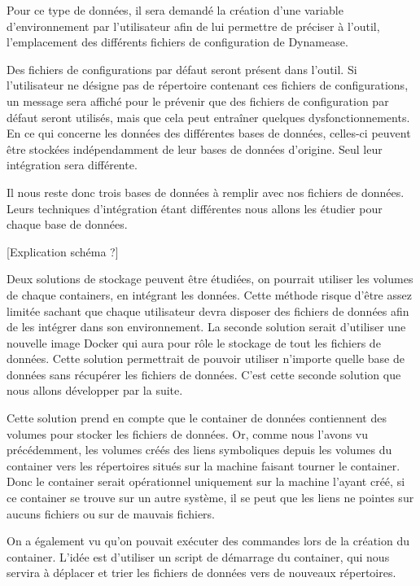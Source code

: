 Pour ce type de données, il sera demandé la création d'une variable d'environnement par l'utilisateur afin de lui permettre de préciser à l'outil, l'emplacement des différents fichiers de configuration de Dynamease. 

Des fichiers de configurations par défaut seront présent dans l'outil. Si l'utilisateur ne désigne pas de répertoire contenant ces fichiers de configurations, un message sera affiché pour le prévenir que des fichiers de configuration par défaut seront utilisés, mais que cela peut entraîner quelques dysfonctionnements.\\

En ce qui concerne les données des différentes bases de données, celles-ci peuvent être stockées indépendamment de leur bases de données d'origine. Seul leur intégration sera différente.

Il nous reste donc trois bases de données à remplir avec nos fichiers de données. Leurs techniques d'intégration étant différentes nous allons les étudier pour chaque base de données. 

[Explication schéma ?] 

Deux solutions de stockage peuvent être étudiées, on pourrait utiliser les volumes de chaque containers, en intégrant les données. Cette méthode risque d'être assez limitée sachant que chaque utilisateur devra disposer des fichiers de données afin de les intégrer dans son environnement. La seconde solution serait d'utiliser une nouvelle image Docker qui aura pour rôle le stockage de tout les fichiers de données. Cette solution permettrait de pouvoir utiliser n'importe quelle base de données sans récupérer les fichiers de données. C'est cette seconde solution que nous allons développer par la suite.

Cette solution prend en compte que le container de données contiennent des volumes pour stocker les fichiers de données. Or, comme nous l'avons vu précédemment, les volumes créés des liens symboliques depuis les volumes du container vers les répertoires situés sur la machine faisant tourner le container. Donc le container serait opérationnel uniquement sur la machine l'ayant créé, si ce container se trouve sur un autre système, il se peut que les liens ne pointes sur aucuns fichiers ou sur de mauvais fichiers. 

On a également vu qu'on pouvait exécuter des commandes lors de la création du container. L'idée est d'utiliser un script de démarrage du container, qui nous servira à déplacer et trier les fichiers de données vers de nouveaux répertoires.

